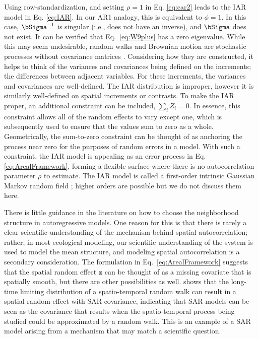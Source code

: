 Using row-standardization, and setting $\rho = 1$ in Eq. \ref{eq:car2} leads to the IAR model in Eq. \ref{eq:IAR}.  In our AR1 analogy, this is equivalent to $\phi = 1$.  In this case, $\bSigma^{-1}$ is singular (i.e., does not have an inverse), and $\bSigma$ does not exist. It can be verified that Eq.~\ref{eq:W9plus} has a zero eigenvalue. While this may seem undesirable, random walks and Brownian motion are stochastic processes without covariance matrices \citep{Codl:Plan:Benh:rand:2008}.  Considering how they are constructed, it helps to think of the variances and covariances being defined on the increments; the differences between adjacent variables.  For these increments, the variances and covariances are well-defined. The IAR distribution is improper, however it is similarly well-defined on spatial increments or contrasts. To make the IAR proper, an additional constraint can be included, $\sum_i Z_i=0$. In essence, this constraint allows all of the random effects to vary except one, which is subsequently used to ensure that the values sum to zero as a whole. Geometrically, the sum-to-zero constraint can be thought of as anchoring the process near zero for the purposes of random errors in a model. With such a constraint, the IAR model is appealing as an error process in Eq. \ref{eq:ArealFramework}, forming a flexible surface where there is no autocorrelation parameter $\rho$ to estimate.  The IAR model is called a first-order intrinsic Gaussian Markov random field \cite[][p. 93]{Rue:Held:Gaus:2005}; higher orders are possible but we do not discuss them here. 

There is little guidance in the literature on how to choose the neighborhood structure in autoregressive models.  One reason for this is that there is rarely a clear scientific understanding of the mechanism behind spatial autocorrelation; rather, in most ecological modeling, our scientific understanding of the system is used to model the mean structure, and modeling spatial autocorrelation is a secondary consideration.  The formulation in Eq.~\ref{eq:ArealFramework} suggests that the spatial random effect $\mathbf{z}$ can be thought of as a missing covariate that is spatially smooth, but there are other possibilities as well. \citet{Hank:mode:2017} shows that the long-time limiting distribution of a spatio-temporal random walk can result in a spatial random effect with SAR covariance, indicating that SAR models can be seen as the covariance that results when the spatio-temporal process being studied could be approximated by a random walk. This is an example of a SAR model arising from a mechanism that may match a scientific question.  

